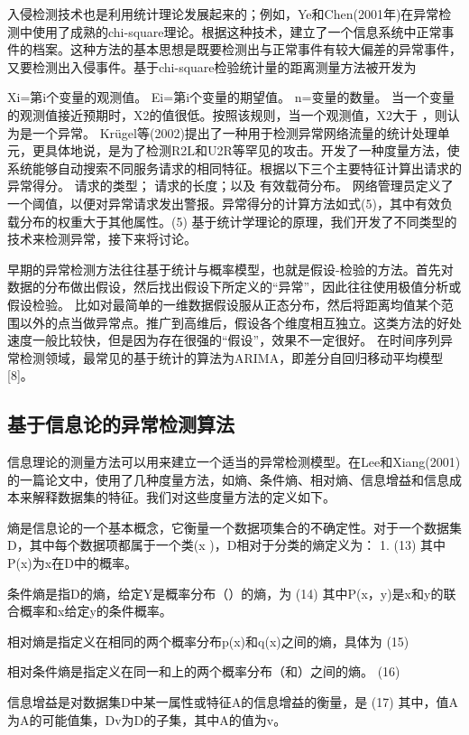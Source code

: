 入侵检测技术也是利用统计理论发展起来的；例如，Ye和Chen(2001年)在异常检测中使用了成熟的chi-square理论。根据这种技术，建立了一个信息系统中正常事件的档案。这种方法的基本思想是既要检测出与正常事件有较大偏差的异常事件，又要检测出入侵事件。基于chi-square检验统计量的距离测量方法被开发为

Xi=第i个变量的观测值。
Ei=第i个变量的期望值。
n=变量的数量。
当一个变量的观测值接近预期时，X2的值很低。按照该规则，当一个观测值，X2大于 ，则认为是一个异常。
Krügel等(2002)提出了一种用于检测异常网络流量的统计处理单元，更具体地说，是为了检测R2L和U2R等罕见的攻击。开发了一种度量方法，使系统能够自动搜索不同服务请求的相同特征。根据以下三个主要特征计算出请求的异常得分。
请求的类型；
请求的长度；以及
有效载荷分布。
网络管理员定义了一个阈值，以便对异常请求发出警报。异常得分的计算方法如式(5)，其中有效负载分布的权重大于其他属性。(5)
基于统计学理论的原理，我们开发了不同类型的技术来检测异常，接下来将讨论。


早期的异常检测方法往往基于统计与概率模型，也就是假设-检验的方法。首先对数据的分布做出假设，然后找出假设下所定义的“异常”，因此往往使用极值分析或假设检验。
比如对最简单的一维数据假设服从正态分布，然后将距离均值某个范围以外的点当做异常点。推广到高维后，假设各个维度相互独立。这类方法的好处速度一般比较快，但是因为存在很强的“假设”，效果不一定很好。
在时间序列异常检测领域，最常见的基于统计的算法为ARIMA，即差分自回归移动平均模型[8]。

\subsection{基于信息论的异常检测算法}

信息理论的测量方法可以用来建立一个适当的异常检测模型。在Lee和Xiang(2001)的一篇论文中，使用了几种度量方法，如熵、条件熵、相对熵、信息增益和信息成本来解释数据集的特征。我们对这些度量方法的定义如下。

熵是信息论的一个基本概念，它衡量一个数据项集合的不确定性。对于一个数据集D，其中每个数据项都属于一个类(x )，D相对于分类的熵定义为： 1.
(13)
其中P(x)为x在D中的概率。


条件熵是指D的熵，给定Y是概率分布（）的熵，为
(14)
其中P(x，y)是x和y的联合概率和x给定y的条件概率。


相对熵是指定义在相同的两个概率分布p(x)和q(x)之间的熵，具体为
(15)

相对条件熵是指定义在同一和上的两个概率分布（和）之间的熵。
(16)

信息增益是对数据集D中某一属性或特征A的信息增益的衡量，是
(17)
其中，值A为A的可能值集，Dv为D的子集，其中A的值为v。


